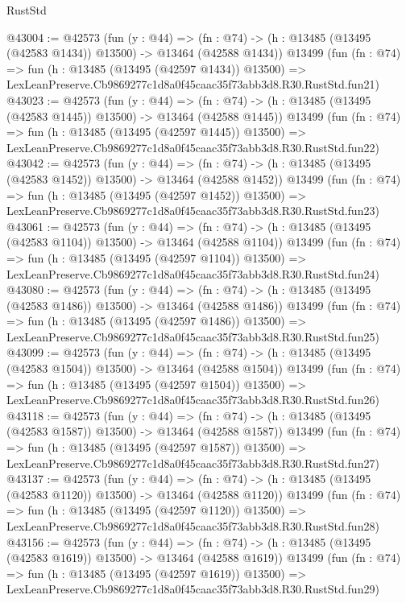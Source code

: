 \begin{lexlean}{RustStd}
\begin{coremodule}
@43004 := @42573
    (fun (y : @44) =>
    (fn : @74) -> (h : @13485 (@13495 (@42583 @1434)) @13500) -> @13464 (@42588 @1434))
    @13499
    (fun (fn : @74) =>
    fun (h : @13485 (@13495 (@42597 @1434)) @13500) =>
    LexLeanPreserve.Cb9869277c1d8a0f45caac35f73abb3d8.R30.RustStd.fun21)
@43023 := @42573
    (fun (y : @44) =>
    (fn : @74) -> (h : @13485 (@13495 (@42583 @1445)) @13500) -> @13464 (@42588 @1445))
    @13499
    (fun (fn : @74) =>
    fun (h : @13485 (@13495 (@42597 @1445)) @13500) =>
    LexLeanPreserve.Cb9869277c1d8a0f45caac35f73abb3d8.R30.RustStd.fun22)
@43042 := @42573
    (fun (y : @44) =>
    (fn : @74) -> (h : @13485 (@13495 (@42583 @1452)) @13500) -> @13464 (@42588 @1452))
    @13499
    (fun (fn : @74) =>
    fun (h : @13485 (@13495 (@42597 @1452)) @13500) =>
    LexLeanPreserve.Cb9869277c1d8a0f45caac35f73abb3d8.R30.RustStd.fun23)
@43061 := @42573
    (fun (y : @44) =>
    (fn : @74) -> (h : @13485 (@13495 (@42583 @1104)) @13500) -> @13464 (@42588 @1104))
    @13499
    (fun (fn : @74) =>
    fun (h : @13485 (@13495 (@42597 @1104)) @13500) =>
    LexLeanPreserve.Cb9869277c1d8a0f45caac35f73abb3d8.R30.RustStd.fun24)
@43080 := @42573
    (fun (y : @44) =>
    (fn : @74) -> (h : @13485 (@13495 (@42583 @1486)) @13500) -> @13464 (@42588 @1486))
    @13499
    (fun (fn : @74) =>
    fun (h : @13485 (@13495 (@42597 @1486)) @13500) =>
    LexLeanPreserve.Cb9869277c1d8a0f45caac35f73abb3d8.R30.RustStd.fun25)
@43099 := @42573
    (fun (y : @44) =>
    (fn : @74) -> (h : @13485 (@13495 (@42583 @1504)) @13500) -> @13464 (@42588 @1504))
    @13499
    (fun (fn : @74) =>
    fun (h : @13485 (@13495 (@42597 @1504)) @13500) =>
    LexLeanPreserve.Cb9869277c1d8a0f45caac35f73abb3d8.R30.RustStd.fun26)
@43118 := @42573
    (fun (y : @44) =>
    (fn : @74) -> (h : @13485 (@13495 (@42583 @1587)) @13500) -> @13464 (@42588 @1587))
    @13499
    (fun (fn : @74) =>
    fun (h : @13485 (@13495 (@42597 @1587)) @13500) =>
    LexLeanPreserve.Cb9869277c1d8a0f45caac35f73abb3d8.R30.RustStd.fun27)
@43137 := @42573
    (fun (y : @44) =>
    (fn : @74) -> (h : @13485 (@13495 (@42583 @1120)) @13500) -> @13464 (@42588 @1120))
    @13499
    (fun (fn : @74) =>
    fun (h : @13485 (@13495 (@42597 @1120)) @13500) =>
    LexLeanPreserve.Cb9869277c1d8a0f45caac35f73abb3d8.R30.RustStd.fun28)
@43156 := @42573
    (fun (y : @44) =>
    (fn : @74) -> (h : @13485 (@13495 (@42583 @1619)) @13500) -> @13464 (@42588 @1619))
    @13499
    (fun (fn : @74) =>
    fun (h : @13485 (@13495 (@42597 @1619)) @13500) =>
    LexLeanPreserve.Cb9869277c1d8a0f45caac35f73abb3d8.R30.RustStd.fun29)

\end{coremodule}
\end{lexlean}

